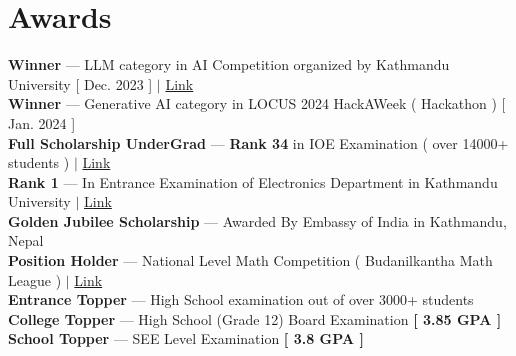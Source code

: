 \documentclass[letterpaper,11pt]{article}
\begin{document}
\section{Awards}
 \begin{itemize}[leftmargin=0.15in, label={}]
    \small{\item{
      
     \textbf{Winner} --- LLM category in AI Competition organized by Kathmandu University [ Dec. 2023 ] $|$ \href{https://drive.google.com/file/d/17n9UAwc-aAJ3otnM_pIHE0vDmtzOqq-n/view?usp=sharing} {Link} \\
     \textbf{Winner} --- Generative AI category in LOCUS 2024 HackAWeek ( Hackathon ) [ Jan. 2024 ]  \\
     \textbf{Full Scholarship UnderGrad} --- \textbf{Rank 34} in IOE Examination ( over 14000+ students ) $|$ \href{https://drive.google.com/file/d/1_MvcP7meGE8mIQxZAO7Hz9Vbxk0pSP1K/view?usp=sharing}{Link} \\ 
     \textbf{Rank 1} --- In Entrance Examination of Electronics Department in Kathmandu University $|$ \href{https://drive.google.com/file/d/1X-Y8wiW2V9wkpL8saZtm-m9GjEmd4ucw/view?usp=sharing}{Link}  \\
     \textbf{Golden Jubilee Scholarship} --- Awarded By Embassy of India in Kathmandu, Nepal \\ 
     \textbf{Position Holder} --- National Level Math Competition ( Budanilkantha Math League ) $|$ \href{https://drive.google.com/file/d/1m9y8K__JwSjUIRcTCnVE2ZA3ZiraBUZE/view?usp=sharing}{Link} \\
     
     \textbf{Entrance Topper} --- High School examination out of over 3000+ students  \\
     \textbf{College Topper} --- High School (Grade 12) Board Examination \textbf{[ 3.85 GPA ]}  \\
     \textbf{School Topper} --- SEE Level Examination \textbf{[ 3.8 GPA ]}  \\
    }}
 \end{itemize}


\end{document}
